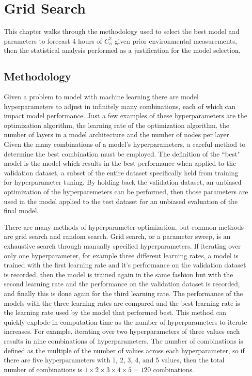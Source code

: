 \chapter{Grid Search}
\label{ch4}
This chapter walks through the methodology used to select the best model and parameters to forecast 4 hours of $C_{n}^{2}$ given prior environmental measurements, then the statistical analysis performed as a justification for the model selection.

\section{Methodology}
Given a problem to model with machine learning there are model hyperparameters to adjust in infinitely many combinations, each of which can impact model performance. Just a few examples of these hyperparameters are the optimization algorithm, the learning rate of the optimization algorithm, the number of layers in a model architecture and the number of nodes per layer. Given the many combinations of a model's hyperparameters, a careful method to determine the best combination must be employed. The definition of the ``best" model is the model which results in the best performance when applied to the validation dataset, a subset of the entire dataset specifically held from training for hyperparameter tuning. By holding back the validation dataset, an unbiased optimization of the hyperparemeters can be performed, then those parameters are used in the model applied to the test dataset for an unbiased evaluation of the final model.

There are many methods of hyperparameter optimization, but common methods are grid search and random search. Grid search, or a parameter sweep, is an exhaustive search through manually specified hyperparameters. If iterating over only one hyperparameter, for example three different learning rates, a model is trained with the first learning rate and it's performance on the validation dataset is recorded, then the model is trained again in the same fashion but with the second learning rate and the performance on the validation dataset is recorded, and finally this is done again for the third learning rate. The performance of the models with the three learning rates are compared and the best learning rate is the learning rate used by the model that performed best. This method can quickly explode in computation time as the number of hyperparameters to iterate increases. For example, iterating over two hyperparameters of three values each results in nine combinations of hyperparameters. The number of combinations is defined as the multiple of the number of values across each hyperparameter, so if there are five hyperparameters with 1, 2, 3, 4, and 5 values, then the total number of combinations is $1 \times 2 \times 3 \times 4 \times 5 = 120$ combinations.

